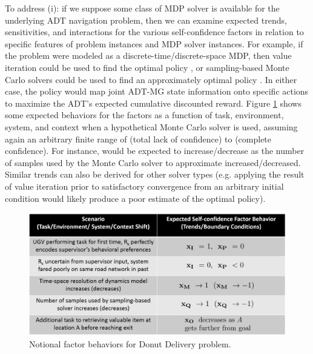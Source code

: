 To address (i): if we suppose some class of MDP solver is available for the underlying ADT navigation problem, then we can examine expected trends, sensitivities, and interactions for the various self-confidence factors in relation to specific features of problem instances and MDP solver instances. 
For example, if the problem were modeled  as a discrete-time/discrete-space MDP, then value iteration could be used to find the optimal policy \policyopt, or sampling-based Monte Carlo solvers could be used to find an approximately optimal policy \policy{}  \cite{Browne2012-lj}. In either case, the policy would map joint ADT-MG state information onto specific actions to maximize the ADT's expected cumulative discounted reward.  
Figure \ref{fig:trendsBCs} shows some expected behaviors for the \famsec{} factors as a function of task, environment, system, and context when a hypothetical Monte Carlo solver is used, assuming again an arbitrary finite range of \flow{} (total lack of confidence) to \fup{} (complete confidence). For instance, \xQ{} would be expected to increase/decrease as the number of samples used by the Monte Carlo solver to approximate \policyopt{} increased/decreased. Similar trends can also be derived for other solver types (e.g. applying the result of value iteration prior to satisfactory convergence from an arbitrary initial condition would likely produce a poor estimate of the optimal policy). %
\begin{figure}[tbp]
    \centering
    \includegraphics[width=0.65\linewidth]{Figures/scTrendsBoundaryExample_2generic.png}
    \caption{Notional \famsec{} factor behaviors for Donut Delivery problem.  }
    \label{fig:trendsBCs}
    \vspace{-0.5 cm}
\end{figure}

